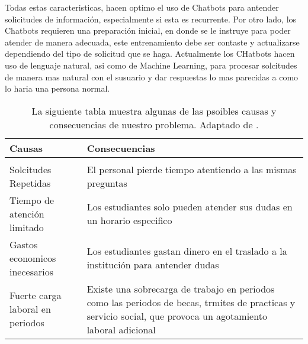 Todas estas caracteristicas, hacen optimo el uso de Chatbots para antender solicitudes de información, especialmente si esta es recurrente. Por otro lado, los Chatbots requieren una preparación inicial, en donde se le instruye para poder atender de manera adecuada, este entrenamiento debe ser contaste y actualizarse dependiendo del tipo de solicitud que se haga. Actualmente los CHatbots hacen uso de lenguaje natural, asi como de Machine Learning, para procesar solcitudes de manera mas natural con el susuario y dar respuestas lo mas parecidas a como lo haria una persona normal.

\begin{table}[!ht]
\centering
\caption{La siguiente tabla muestra algunas de las psoibles causas y consecuencias de nuestro problema. Adaptado de \citep{bib_tesis1}.} 
\label{tab:ejemplo}
\begin{tabular}{|p{5.0cm}|p{9.0cm}|}
\hline
Causas & Consecuencias \\ [0.5ex] 
\hline\hline & \\ [0.5ex]
Solcitudes Repetidas & El personal pierde tiempo atentiendo a las mismas preguntas \\ [2ex]
Tiempo de atención limitado & Los estudiantes solo pueden atender sus dudas en un horario especifico \\[2ex]
Gastos economicos inecesarios & Los estudiantes gastan dinero en el traslado a la institución para antender dudas \\[2ex]
Fuerte carga laboral en periodos & Existe una sobrecarga de trabajo en periodos como las periodos de becas, trmites de practicas y servicio social, que provoca un agotamiento laboral adicional \\ [2ex]
\hline
\end{tabular}
\end{table}
